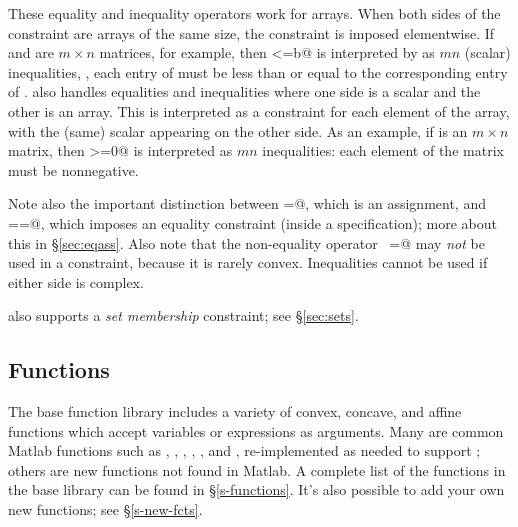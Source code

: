 \documentclass[12pt]{article}
\begin{document}
These equality and inequality operators work for arrays.
When both sides of the constraint are arrays of the same size,
the constraint is imposed elementwise.  If \verb@a@ and \verb@b@
are $m \times n$ matrices, for example, then \verb@a<=b@
is interpreted by \cvx as $mn$ (scalar) inequalities, \ie,
each entry of \verb@a@ must be less than or equal to
the corresponding entry of \verb@b@.
\cvx also handles equalities and inequalities where one side is 
a scalar and the other is an array.  This is interpreted as a
constraint for each element of the array, with the (same) scalar
appearing on the other side.
As an example, if \verb@a@ is an $m\times n$ matrix, then \verb@a>=0@ 
is interpreted as $mn$ inequalities: each element of the matrix
must be nonnegative.

Note also the important distinction between \verb@=@, which is an 
assignment, and \verb@==@, which imposes an equality constraint
(inside a \cvx specification); more about this in \S\ref{sec:eqass}.
Also note that the non-equality operator \verb@~=@ may \emph{not}
be used in a constraint, because it is rarely convex.
Inequalities cannot be used if either side is complex.

\cvx also supports a \emph{set membership} constraint; 
see \S\ref{sec:sets}.

\subsection{Functions}

The base \cvx function library
includes a variety of convex, concave, and affine functions
which accept \cvx variables or expressions as arguments.
Many are common Matlab functions
such as \verb@sum@, \verb@trace@, \verb@diag@, \verb@sqrt@,
\verb@max@, and \verb@min@,
re-implemented as needed to support \cvx; others are new
functions not found in Matlab.
A complete list of the functions in the base library 
can be found in \S\ref{s-functions}.
It's also possible to add your own new functions;
see \S\ref{s-new-fcts}.
\end{document}

